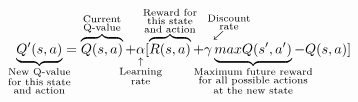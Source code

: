 \setlength\parindent{15pt}
\[
 \underbrace{Q'(s,a)}_{\mathclap{\substack{\text{New Q-value} \\ \text{for this state} \\ \text{and action}}}} 
  = \overbrace{Q(s,a)}^{\mathclap{\substack{\text{Current} \\ \text{Q-value}}}} 
  + \underset{\mathclap{\substack{\\ \uparrow \\ \text{Learning} \\ \text{rate}}}}{\alpha}
  [ \overbrace{R(s,a)}^{\mathclap{\substack{\text{Reward for} \\ \text{this state} \\ \text{and action}}}} 
  + \overset{\mathclap{\substack{\text{\indent\indent  Discount} \\ \text{\indent\indent rate} \\ \indent\swarrow \\ \text{}}}}{\gamma} 
  \underbrace{maxQ(s',a')}_{\mathclap{\substack{\text{Maximum future reward} \\ \text{for all possible actions} \\ \text{at the new state}}}}
  - Q(s, a)] 
\]
\setlength\parindent{0pt}